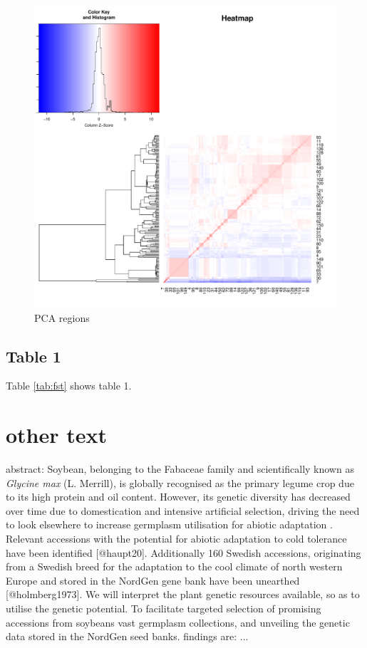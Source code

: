 \documentclass[9pt, onecolumn,twoside]{gsajnl}
\begin{document}
\begin{figure}[t]
\centering
\includegraphics[width=\linewidth]{plot_heatmap.pdf}
\caption{PCA regions}
\label{fig:heat}
\end{figure}



\subsection{Table 1}

Table  \ref{tab:fst} shows table 1. 

\section{other text}

abstract:
Soybean, belonging to the Fabaceae family and scientifically known as \textit{Glycine max} (L. Merrill), is globally recognised as the primary legume crop due to its high protein and oil content. However, its genetic diversity has decreased over time due to domestication and intensive artificial selection, driving the need to look elsewhere to increase germplasm utilisation for abiotic adaptation \citep{hyten06, gizlice96}.  Relevant accessions with the potential for abiotic adaptation to cold tolerance have been identified [@haupt20]. Additionally 160 Swedish accessions, originating from a Swedish breed for the adaptation to the cool climate of north western Europe and stored in the NordGen gene bank have been unearthed [@holmberg1973]. We will interpret the plant genetic resources available, so as to utilise the genetic potential. To facilitate targeted selection of promising accessions from soybeans vast germplasm collections,  and unveiling the genetic data stored in the NordGen seed banks. findings are: ... 
\end{document}
